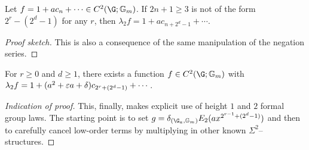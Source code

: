 \begin{lemma}\label{SigmaArrowLemma}
Let \(f = 1 + a c_n + \cdots \in C^2(\G; \Gm)\).
If \(2n+1 \ge 3\) is not of the form \(2^r - (2^d - 1)\) for any \(r\), then \(\lambda_2 f = 1 + a c_{n + 2^d - 1} + \cdots\).
\end{lemma}
\begin{proof}[Proof sketch]
This is also a consequence of the same manipulation of the negation series.
\end{proof}

\begin{lemma}\label{SigmaSpecialCaseLemma}
For \(r \ge 0\) and \(d \ge 1\), there exists a function \(f \in C^2(\G; \Gm)\) with \(\lambda_2 f = 1 + (a^2 + \varepsilon a + \delta) c_{2^r + (2^d - 1)} + \cdots\).
\end{lemma}
\begin{proof}[Indication of proof]
This, finally, makes explicit use of height \(1\) and \(2\) formal group laws.
The starting point is to set \(g = \delta_{(\G_a, \Gm)}E_2(ax^{2^{r-1} + (2^d-1)})\) and then to carefully cancel low-order terms by multiplying in other known \(\Sigma^2\)--structures.
\end{proof}

